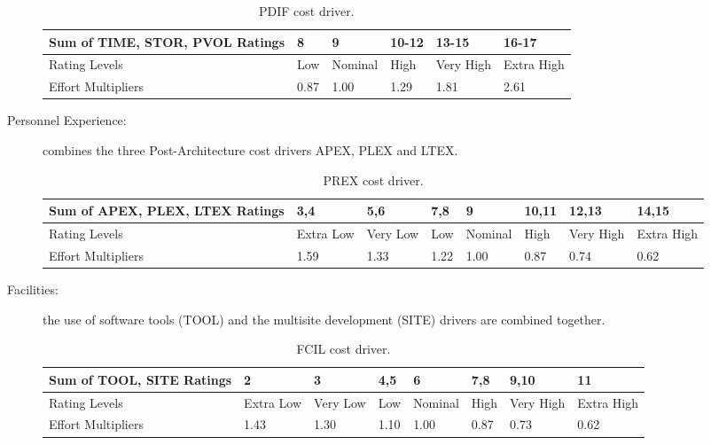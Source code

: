 \begin{description}
\begin{table}[H]
	\begin{adjustwidth}{-.5in}{-.5in}
    \centering
    \begin{tabular}{p{4cm}|p{1cm}|p{1.5cm}|p{1cm}|p{1cm}|p{1cm}}
        \hline
        Sum of TIME, STOR, PVOL Ratings & 8 & 9 & 10-12 & 13-15 & 16-17 \\
        \hline
        \hline
        Rating Levels & Low & Nominal & High & Very High & Extra High \\
        \hline
        Effort Multipliers & 0.87 & 1.00 & 1.29 & 1.81 & 2.61 \\
        \hline
    \end{tabular}
    \caption{PDIF cost driver.}
    \end{adjustwidth}
\end{table}

\item[Personnel Experience:] combines the three Post-Architecture cost drivers APEX, PLEX and LTEX.

\begin{table}[H]
	\begin{adjustwidth}{-.5in}{-.5in}
    \centering
    \begin{tabular}{p{4cm}|p{1cm}|p{1cm}|p{1cm}|p{1.5cm}|p{1cm}|p{1cm}|p{1cm}}
        \hline
        Sum of APEX, PLEX, LTEX Ratings & 3,4 & 5,6 & 7,8 & 9 & 10,11 & 12,13 & 14,15 \\
        \hline
        \hline
        Rating Levels & Extra Low & Very Low & Low & Nominal & High & Very High & Extra High \\
        \hline
        Effort Multipliers & 1.59 & 1.33 & 1.22 & 1.00 & 0.87 & 0.74 & 0.62 \\
        \hline
    \end{tabular}
    \caption{PREX cost driver.}
    \end{adjustwidth}
\end{table}

\item[Facilities:] the use of software tools (TOOL) and the multisite development (SITE) drivers are combined together.

\begin{table}[H]
	\begin{adjustwidth}{-.5in}{-.5in}
    \centering
    \begin{tabular}{p{4cm}|p{1cm}|p{1cm}|p{1cm}|p{1.5cm}|p{1cm}|p{1cm}|p{1cm}}
        \hline
        Sum of TOOL, SITE Ratings & 2 & 3 & 4,5 & 6 & 7,8 & 9,10 & 11 \\
        \hline
        \hline
        Rating Levels & Extra Low & Very Low & Low & Nominal & High & Very High & Extra High \\
        \hline
        Effort Multipliers & 1.43 & 1.30 & 1.10 & 1.00 & 0.87 & 0.73 & 0.62 \\
        \hline
    \end{tabular}
    \caption{FCIL cost driver.}
    \end{adjustwidth}
\end{table}


\end{description}
